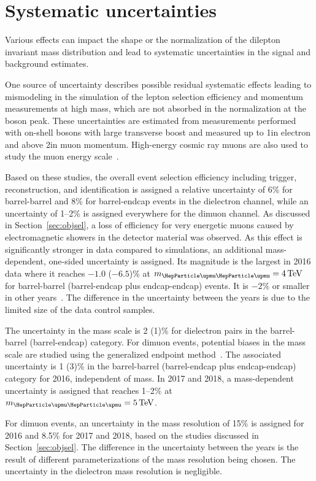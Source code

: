 \documentclass[11pt,twoside,a4paper,cmspaper,final,collab]{cms-tdr}
\begin{document}
\section{Systematic uncertainties}
Various effects can impact the shape or the normalization of the dilepton invariant mass distribution and lead to systematic uncertainties in the signal and background estimates. 

One source of uncertainty describes possible residual systematic effects leading to mismodeling in the simulation of the lepton selection efficiency and momentum measurements at high mass, which are not absorbed in the normalization at the \PZ boson peak. These uncertainties are estimated from measurements performed with on-shell \PZ bosons with large transverse boost and measured up to 1\TeV in electron \pt and above 2\TeV in muon momentum. High-energy cosmic ray muons are also used to study the muon energy scale~\cite{Sirunyan:2019yvv}. 

Based on these studies, the overall event selection efficiency including trigger, reconstruction, and identification is assigned a relative uncertainty of 6\% for barrel-barrel and 8\% for barrel-endcap events in the dielectron channel, while an uncertainty of 1--2\% is assigned everywhere for the dimuon channel. As discussed in Section~\ref{sec:objsel}, a loss of efficiency for very energetic muons caused by electromagnetic
showers in the detector material was observed. As this effect is significantly stronger in data compared to simulations, an additional mass-dependent, one-sided uncertainty is assigned. Its magnitude is the largest in 2016 data where it reaches $-1.0$ ($-6.5$)\% at $\muu = 4\TeV$ for barrel-barrel (barrel-endcap plus endcap-endcap) events. It is $-2$\% or smaller in other years~\cite{Sirunyan:2019yvv}. The difference in the uncertainty between the years is due to the limited size of the data control samples.
 
The uncertainty in the mass scale is 2 (1)\% for dielectron pairs in the barrel-barrel (barrel-endcap) category. For dimuon events, potential biases in the mass scale are studied using the generalized endpoint method~\cite{Sirunyan:2019yvv}. The associated uncertainty is 1 (3)\% in the barrel-barrel (barrel-endcap plus endcap-endcap) category for 2016, independent of mass. In 2017 and 2018, a mass-dependent uncertainty is assigned that reaches 1--2\% at $\muu = 5\TeV$.

For dimuon events, an uncertainty in the mass resolution of 15\% is assigned for 2016 and 8.5\% for 2017 and 2018, based on the studies discussed in Section~\ref{sec:objsel}. The difference in the uncertainty between the years is the result of different parameterizations of the mass resolution being chosen. The uncertainty in the dielectron mass resolution is negligible.
\end{document}
